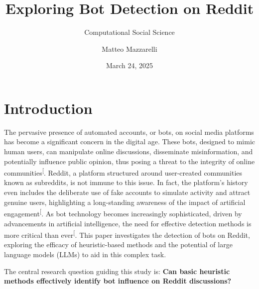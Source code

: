 \documentclass[
  12pt,
  letterpaper,
  DIV=11,
  numbers=noendperiod]{scrartcl}
\title{Exploring Bot Detection on Reddit}
\subtitle{Computational Social Science}
\author{Matteo Mazzarelli}
\date{March 24, 2025}
\begin{document}
\maketitle


\section{Introduction}\label{introduction}

The pervasive presence of automated accounts, or bots, on social media
platforms has become a significant concern in the digital age. These
bots, designed to mimic human users, can manipulate online discussions,
disseminate misinformation, and potentially influence public opinion,
thus posing a threat to the integrity of online
communities\textsuperscript{{[}\citeproc{ref-botdetectionreddit}{1}{]}}.
Reddit, a platform structured around user-created communities known as
subreddits, is not immune to this issue. In fact, the platform's history
even includes the deliberate use of fake accounts to simulate activity
and attract genuine users, highlighting a long-standing awareness of the
impact of artificial
engagement\textsuperscript{{[}\citeproc{ref-redditbotproblem}{2}{]}}. As
bot technology becomes increasingly sophisticated, driven by
advancements in artificial intelligence, the need for effective
detection methods is more critical than
ever\textsuperscript{{[}\citeproc{ref-botdetectionreddit}{1}{]}}. This
paper investigates the detection of bots on Reddit, exploring the
efficacy of heuristic-based methods and the potential of large language
models (LLMs) to aid in this complex task.

The central research question guiding this study is: \textbf{Can basic
heuristic methods effectively identify bot influence on Reddit
discussions?}
\end{document}
